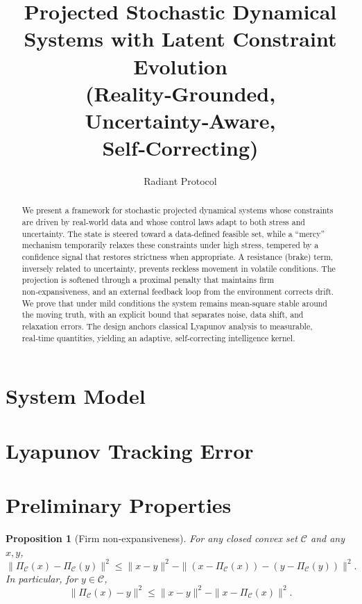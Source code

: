 \documentclass{article}
\title{Projected Stochastic Dynamical Systems with Latent Constraint Evolution\\
\large (Reality‑Grounded, Uncertainty‑Aware, Self‑Correcting)}
\author{Radiant Protocol}
\date{}
\newtheorem{proposition}[theorem]{Proposition}
\begin{document}
\maketitle

\begin{abstract}
We present a framework for stochastic projected dynamical systems whose constraints are driven by real‑world data and whose control laws adapt to both stress and uncertainty. The state is steered toward a data‑defined feasible set, while a ``mercy'' mechanism temporarily relaxes these constraints under high stress, tempered by a confidence signal that restores strictness when appropriate. A resistance (brake) term, inversely related to uncertainty, prevents reckless movement in volatile conditions. The projection is softened through a proximal penalty that maintains firm non‑expansiveness, and an external feedback loop from the environment corrects drift. We prove that under mild conditions the system remains mean‑square stable around the moving truth, with an explicit bound that separates noise, data shift, and relaxation errors. The design anchors classical Lyapunov analysis to measurable, real‑time quantities, yielding an adaptive, self‑correcting intelligence kernel.
\end{abstract}

\section{System Model}
\label{sec:model}


\section{Lyapunov Tracking Error}

\section{Preliminary Properties}

\begin{proposition}[Firm non‑expansiveness]
\label{prop:firm}
For any closed convex set $\mathcal{C}$ and any $x,y$,
\[
\|\Pi_{\mathcal{C}}(x) - \Pi_{\mathcal{C}}(y)\|^2 \le \|x - y\|^2
- \|(x - \Pi_{\mathcal{C}}(x)) - (y - \Pi_{\mathcal{C}}(y))\|^2.
\]
In particular, for $y \in \mathcal{C}$,
\[
\|\Pi_{\mathcal{C}}(x) - y\|^2 \le \|x - y\|^2 - \|x - \Pi_{\mathcal{C}}(x)\|^2.
\]
\end{proposition}
\end{document}
